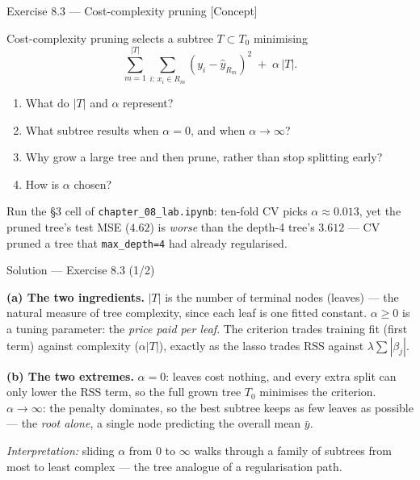 \documentclass[aspectratio=169,11pt]{beamer}
\begin{document}
\begin{frame}{Exercise 8.3 --- Cost-complexity pruning [Concept]}
\begin{exercise}
Cost-complexity pruning selects a subtree $T\subset T_0$ minimising
\[ \sum_{m=1}^{|T|}\sum_{i:\,x_i\in R_m}(y_i-\hat y_{R_m})^2 \;+\; \alpha\,|T|. \]
\begin{enumerate}
  \item What do $|T|$ and $\alpha$ represent?
  \item What subtree results when $\alpha=0$, and when $\alpha\to\infty$?
  \item Why grow a large tree and then prune, rather than stop splitting early?
  \item How is $\alpha$ chosen?
\end{enumerate}
\end{exercise}
\begin{labnote}
Run the \S3 cell of \texttt{chapter\_08\_lab.ipynb}: ten-fold CV picks $\alpha\approx0.013$, yet the pruned tree's test MSE ($4.62$) is \emph{worse} than the depth-4 tree's $3.612$ --- CV pruned a tree that \texttt{max\_depth=4} had already regularised.
\end{labnote}
\end{frame}

\begin{frame}{Solution --- Exercise 8.3 (1/2)}
\begin{solutionbox}
\textbf{(a) The two ingredients.} $|T|$ is the number of terminal nodes (leaves) --- the natural measure of tree complexity, since each leaf is one fitted constant. $\alpha\ge 0$ is a tuning parameter: the \emph{price paid per leaf}. The criterion trades training fit (first term) against complexity ($\alpha|T|$), exactly as the lasso trades RSS against $\lambda\sum|\beta_j|$.

\medskip
\textbf{(b) The two extremes.} $\alpha=0$: leaves cost nothing, and every extra split can only lower the RSS term, so the full grown tree $T_0$ minimises the criterion. $\alpha\to\infty$: the penalty dominates, so the best subtree keeps as few leaves as possible --- the \emph{root alone}, a single node predicting the overall mean $\bar y$.

\medskip
\emph{Interpretation:} sliding $\alpha$ from $0$ to $\infty$ walks through a family of subtrees from most to least complex --- the tree analogue of a regularisation path.
\end{solutionbox}
\end{frame}
\end{document}
